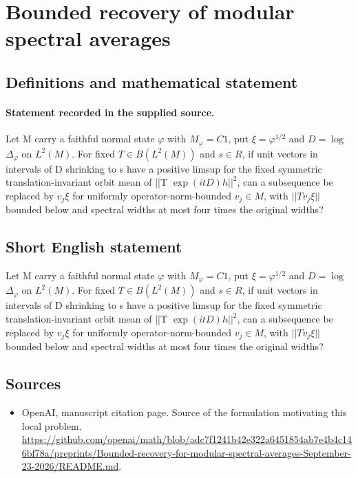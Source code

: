 \documentclass[11pt]{article}
\begin{document}
\section*{Bounded recovery of modular spectral averages}\label{30007297}
\subsection{Definitions and mathematical statement}
\paragraph{Statement recorded in the supplied source.}
Let M carry a faithful normal state $\varphi $ with $M_\varphi =C1$, put $\xi =\varphi ^{1/2}$ and $D=\log $ $\Delta _\varphi $ on $L^{2}(M)$. For fixed $T\in B(L^{2}(M))$ and $s\in R$, if unit vectors in intervals of D shrinking to s have a positive limsup for the fixed symmetric translation-invariant orbit mean of ||T $\exp (itD)h||^{2}$, can a subsequence be replaced by $v_j\xi $ for uniformly operator-norm-bounded $v_j\in M$, with $||Tv_j\xi ||$ bounded below and spectral widths at most four times the original widths?
\subsection{Short English statement}
Let M carry a faithful normal state $\varphi $ with $M_\varphi =C1$, put $\xi =\varphi ^{1/2}$ and $D=\log $ $\Delta _\varphi $ on $L^{2}(M)$. For fixed $T\in B(L^{2}(M))$ and $s\in R$, if unit vectors in intervals of D shrinking to s have a positive limsup for the fixed symmetric translation-invariant orbit mean of ||T $\exp (itD)h||^{2}$, can a subsequence be replaced by $v_j\xi $ for uniformly operator-norm-bounded $v_j\in M$, with $||Tv_j\xi ||$ bounded below and spectral widths at most four times the original widths?
\subsection{Sources}
\begin{itemize}
\item[S1] OpenAI, manuscript citation page. Source of the formulation motivating this local problem.
\url{https://github.com/openai/math/blob/adc7f1241b42e322a6451854ab7e4b4c146bf78a/preprints/Bounded-recovery-for-modular-spectral-averages-September-23-2026/README.md}.
\end{itemize}
\end{document}
